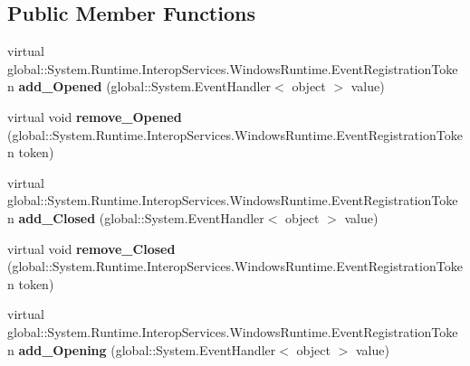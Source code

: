 \subsection*{Public Member Functions}
\begin{DoxyCompactItemize}
\item 
\mbox{\label{class_windows_1_1_u_i_1_1_xaml_1_1_controls_1_1_primitives_1_1_flyout_base_a897348c50b44a1e97d0d95c49c1bd853}} 
virtual global\+::\+System.\+Runtime.\+Interop\+Services.\+Windows\+Runtime.\+Event\+Registration\+Token {\bfseries add\+\_\+\+Opened} (global\+::\+System.\+Event\+Handler$<$ object $>$ value)
\item 
\mbox{\label{class_windows_1_1_u_i_1_1_xaml_1_1_controls_1_1_primitives_1_1_flyout_base_a4bd2f94eb6ae77227752ea52d9497eb1}} 
virtual void {\bfseries remove\+\_\+\+Opened} (global\+::\+System.\+Runtime.\+Interop\+Services.\+Windows\+Runtime.\+Event\+Registration\+Token token)
\item 
\mbox{\label{class_windows_1_1_u_i_1_1_xaml_1_1_controls_1_1_primitives_1_1_flyout_base_a5f48a350689b2ef057ac2a870cfbbc9f}} 
virtual global\+::\+System.\+Runtime.\+Interop\+Services.\+Windows\+Runtime.\+Event\+Registration\+Token {\bfseries add\+\_\+\+Closed} (global\+::\+System.\+Event\+Handler$<$ object $>$ value)
\item 
\mbox{\label{class_windows_1_1_u_i_1_1_xaml_1_1_controls_1_1_primitives_1_1_flyout_base_a910f4919b18377849ddf436963142092}} 
virtual void {\bfseries remove\+\_\+\+Closed} (global\+::\+System.\+Runtime.\+Interop\+Services.\+Windows\+Runtime.\+Event\+Registration\+Token token)
\item 
\mbox{\label{class_windows_1_1_u_i_1_1_xaml_1_1_controls_1_1_primitives_1_1_flyout_base_a8dbfb4d3df5e017a006229b035558c61}} 
virtual global\+::\+System.\+Runtime.\+Interop\+Services.\+Windows\+Runtime.\+Event\+Registration\+Token {\bfseries add\+\_\+\+Opening} (global\+::\+System.\+Event\+Handler$<$ object $>$ value)

\end{DoxyCompactItemize}
